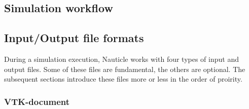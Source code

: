 \documentclass[a4paper,12pt,openany]{book}
\theoremstyle{break}
\begin{document}
\subsection{Simulation workflow} \label{sec:sim_workflow}
\subsection{Input/Output file formats}
During a simulation execution, Nauticle works with four types of input and output files. Some of these files are fundamental, the others are optional. The subsequent sections introduce these files more or less in the order of proirity.
\subsubsection{VTK-document}
\end{document}
